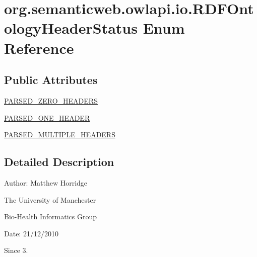 \hypertarget{enumorg_1_1semanticweb_1_1owlapi_1_1io_1_1_r_d_f_ontology_header_status}{\section{org.\-semanticweb.\-owlapi.\-io.\-R\-D\-F\-Ontology\-Header\-Status Enum Reference}
\label{enumorg_1_1semanticweb_1_1owlapi_1_1io_1_1_r_d_f_ontology_header_status}
}
\subsection*{Public Attributes}
\begin{DoxyCompactItemize}
\item 
\hyperlink{enumorg_1_1semanticweb_1_1owlapi_1_1io_1_1_r_d_f_ontology_header_status_a8295e083a8caf6c02634a5213ab1ae42}{P\-A\-R\-S\-E\-D\-\_\-\-Z\-E\-R\-O\-\_\-\-H\-E\-A\-D\-E\-R\-S}
\item 
\hyperlink{enumorg_1_1semanticweb_1_1owlapi_1_1io_1_1_r_d_f_ontology_header_status_a2fccd7397a6c04da597d509cdda4f0bf}{P\-A\-R\-S\-E\-D\-\_\-\-O\-N\-E\-\_\-\-H\-E\-A\-D\-E\-R}
\item 
\hyperlink{enumorg_1_1semanticweb_1_1owlapi_1_1io_1_1_r_d_f_ontology_header_status_a1b43f4862e06d22e0b65975ed88b6f51}{P\-A\-R\-S\-E\-D\-\_\-\-M\-U\-L\-T\-I\-P\-L\-E\-\_\-\-H\-E\-A\-D\-E\-R\-S}
\end{DoxyCompactItemize}


\subsection{Detailed Description}
Author\-: Matthew Horridge\par
 The University of Manchester\par
 Bio-\/\-Health Informatics Group\par
 Date\-: 21/12/2010 \begin{DoxySince}{Since}
3. 
\end{DoxySince}


